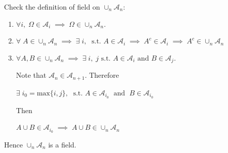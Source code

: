 \begin{list}{1.9.}{}
\item Check the definition of field on $\cup_n \mathcal{A}_n$:
  \begin{enumerate}
  \item $\forall i,\; \Omega \in \mathcal{A}_i
    \;\implies\;
    \Omega\in\cup_n\mathcal{A}_n$.
  \item $\forall\;A\in\cup_n\mathcal{A}_n
    \;\implies\;
    \exists\; i,\; \text{ s.t. } A \in \mathcal{A}_i
    \;\implies\;
    A^c\in\mathcal{A}_i
    \;\implies\;
    A^c\in\cup_n\mathcal{A}_n$
  \item $\forall A, B \in \cup_n\mathcal{A}_n \;\implies\; \exists\;i,\;j \text{ s.t. }A\in\mathcal{A}_i \text{ and }B\in\mathcal{A}_j$.
    \par
    Note that $\mathcal{A}_n \in \mathcal{A}_{n+1}$. Therefore
    \par
    $\exists\; i_0 = \mathrm{max}\{i, j\},\; \text{ s.t. }
    A\in\mathcal{A}_{i_0}\;\text{ and }\;B\in\mathcal{A}_{i_0} $
    \par
    Then
    \par
    $A \cup B \in \mathcal{A}_{i_0} \;\implies\; A \cup B \in \cup_n\mathcal{A}_n$
  \end{enumerate}
  Hence $\cup_n\mathcal{A}_n$ is a field.
\end{list}

\clearpage{}
